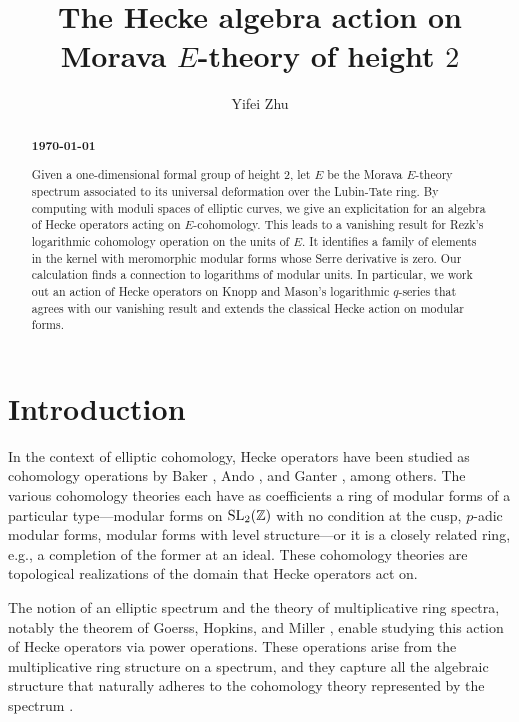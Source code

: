 \documentclass{gtpart}
\title{The Hecke algebra action on Morava $E$-theory of height $2$}
\author{Yifei Zhu}
\theoremstyle{definition}
\theoremstyle{remark}
\newcommand{\mb}[1]{\mathbb{#1}}
\newcommand{\BZ}{{\mb Z}}
\renewcommand{\=}{\approx}
\renewcommand{\-}{\sim}
\newcommand{\SL}{{\rm SL}}
\numberwithin{equation}{section}
\numberwithin{thm}{section}
\begin{document}
\begin{abstract}
 \centerline{\textbf{\today}}\vspace{.5in}

 Given a one-dimensional formal group of height 2, 
 let $E$ be the Morava $E$-theory spectrum associated to its universal deformation over the Lubin-Tate ring.  
 By computing with moduli spaces of elliptic curves, 
 we give an explicitation for an algebra of Hecke operators acting on $E$-cohomology.  
 This leads to a vanishing result for Rezk's logarithmic cohomology operation on the units of $E$.  
 It identifies a family of elements in the kernel with meromorphic modular forms whose Serre derivative is zero.  
 Our calculation finds a connection to logarithms of modular units.  
 In particular, we work out an action of Hecke operators on Knopp and Mason's logarithmic $q$-series 
 that agrees with our vanishing result and extends the classical Hecke action on modular forms.  
\end{abstract}

\maketitle



\section{Introduction}

In the context of elliptic cohomology, Hecke operators have been studied as cohomology 
operations by Baker \cite{Baker90,Baker89}, Ando \cite{Ando95}, and 
Ganter \cite{stringy,moonshine,orbifold}, among others.  The various cohomology theories each have 
as coefficients a ring of modular forms 
of a particular type---modular forms on $\SL_2(\BZ)$ with no condition at the cusp, 
$p$-adic modular forms, modular forms with level structure---or it is a 
closely related ring, e.g., a completion of the former at an ideal.  These cohomology 
theories are topological realizations of the domain that Hecke operators act on.  

The notion of an elliptic spectrum \cite[Definition 1.2]{AHS01} and the theory of multiplicative ring 
spectra, notably the theorem of Goerss, Hopkins, and Miller \cite[Corollary 7.6]{GH}, enable 
studying this action of Hecke operators via power operations.  
These operations arise from the multiplicative ring structure on a spectrum, 
and they capture all the algebraic structure that naturally adheres to the cohomology theory represented by the spectrum \cite{H_infty,lpo}.  
\end{document}
